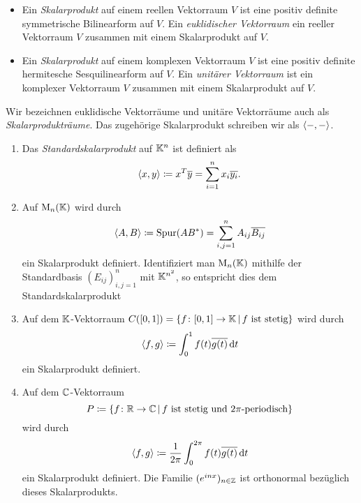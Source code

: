 \begin{definition}
  \leavevmode
  \begin{itemize}
    \item
      Ein \emph{Skalarprodukt} auf einem reellen Vektorraum $V$ ist eine positiv definite symmetrische Bilinearform auf $V$.
      Ein \emph{euklidischer Vektorraum} ein reeller Vektorraum $V$ zusammen mit einem Skalarprodukt auf $V$.
    \item
      Ein \emph{Skalarprodukt} auf einem komplexen Vektorraum $V$ ist eine positiv definite hermitesche Sesquilinearform auf $V$.
      Ein \emph{unitärer Vektorraum} ist ein komplexer Vektorraum $V$ zusammen mit einem Skalarprodukt auf $V$.
  \end{itemize}

  Wir bezeichnen euklidische Vektorräume und unitäre Vektorräume auch als \emph{Skalarprodukträume}.
  Das zugehörige Skalarprodukt schreiben wir als $\left\langle -, - \right\rangle$.
\end{definition}



\begin{example}
  \leavevmode
  \begin{enumerate}
    \item
      Das \emph{Standardskalarprodukt} auf $\mathbb{K}^n$ ist definiert als
      \[
                  \left\langle x, y \right\rangle
        \coloneqq x^T \overline{y}
        =         \sum_{i=1}^n x_i \overline{y_i}.
      \]
    \item
      Auf $\operatorname{M}_{n}(\mathbb{K})$ wird durch
      \[
                  \left\langle A, B \right\rangle
        \coloneqq \operatorname{Spur} (A B^*)
        =         \sum_{i,j = 1}^n A_{ij} \overline{B_{ij}}
      \]
      ein Skalarprodukt definiert.
      Identifiziert man $\operatorname{M}_{n}(\mathbb{K})$ mithilfe der Standardbasis $(E_{ij})_{i,j = 1}^n$ mit $\mathbb{K}^{n^2}$, so entspricht dies dem Standardskalarprodukt

    \item
      Auf dem $\mathbb{K}$-Vektorraum $C([0,1]) = \{f \colon [0,1] \to \mathbb{K} \,|\, \text{$f$ ist stetig} \}$ wird durch
      \[
                  \left\langle f, g \right\rangle
        \coloneqq \int_0^1 f(t) \overline{g(t)} \,\text{d}t
      \]
      ein Skalarprodukt definiert.
    \item
      Auf dem $\mathbb{C}$-Vektorraum
      \[
                  P
        \coloneqq \{
                    f \colon \mathbb{R} \to \mathbb{C}
                  \,|\,
                    \text{$f$ ist stetig und $2\pi$-periodisch}
                  \}
      \]
      wird durch
      \[
                  \left\langle f, g \right\rangle
        \coloneqq \frac{1}{2\pi} \int_0^{2\pi} f(t) \overline{g(t)} \,\text{d}t
      \]
      ein Skalarprodukt definiert.
      Die Familie $(e^{inx})_{n \in \mathbb{Z}}$ ist orthonormal bezüglich dieses Skalarprodukts.
  \end{enumerate}
\end{example}

